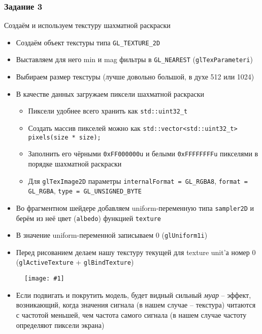 \documentclass{beamer}
\newcommand{\slideimage}[1]{
  \begin{figure}
    \begin{adjustbox}{width=\textwidth, totalheight=\textheight-2\baselineskip-2\baselineskip,keepaspectratio}
      \texttt{[image: \#1]}
    \end{adjustbox}
  \end{figure}
}
\begin{document}
\begin{frame}[fragile]
\frametitle{Задание 3}
\fontsize{8pt}{8pt}\selectfont
Создаём и используем текстуру шахматной раскраски
\begin{itemize}
\item Создаём объект текстуры типа \verb|GL_TEXTURE_2D|
\item Выставляем для него min и mag фильтры в \verb|GL_NEAREST| (\verb|glTexParameteri|)
\item Выбираем размер текстуры (лучше довольно большой, в духе 512 или 1024)
\item В качестве данных загружаем пиксели шахматной раскраски
\begin{itemize}
\item Пиксели удобнее всего хранить как \verb|std::uint32_t|
\item Создать массив пикселей можно как \verb|std::vector<std::uint32_t> pixels(size * size);|
\item Заполнить его чёрными \verb|0xFF000000u| и белыми \verb|0xFFFFFFFFu| пикселями в порядке шахматной раскраски
\item Для \verb|glTexImage2D| параметры \verb|internalFormat = GL_RGBA8|, \verb|format = GL_RGBA|, \verb|type = GL_UNSIGNED_BYTE|
\end{itemize}
\item Во фрагментном шейдере добавляем uniform-переменную типа \verb|sampler2D| и берём из неё цвет (\verb|albedo|) функцией \verb|texture|
\item В значение uniform-переменной записываем 0 (\verb|glUniform1i|)
\item Перед рисованием делаем нашу текстуру текущей для texture unit'а номер 0 (\verb|glActiveTexture| + \verb|glBindTexture|)
\end{itemize}
\end{frame}

\begin{frame}[fragile]
\slideimage{3.png}
\end{frame}

\begin{frame}[fragile]
\begin{itemize}
\item Если подвигать и покрутить модель, будет видный сильный \textit{муар} -- эффект, возникающий, когда значения сигнала (в нашем случае -- текстура) читаются с частотой меньшей, чем частота самого сигнала (в нашем случае частоту определяют пиксели экрана)
\end{itemize}
\end{frame}
\end{document}
